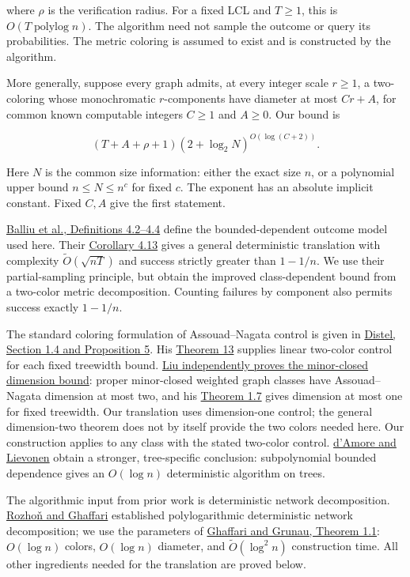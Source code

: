 \documentclass[11pt,a4paper]{article}
\begin{document}
where \(\rho\) is the verification radius.
For a fixed LCL and \(T\ge 1\), this is \(O(T\operatorname{polylog} n)\).
The algorithm need not sample the outcome or query its probabilities.
The metric coloring is assumed to exist and is constructed by the algorithm.

More generally, suppose every graph admits, at every integer scale \(r\ge 1\), a two-coloring whose monochromatic \(r\)-components have diameter at most \(Cr+A\), for common known computable integers \(C\ge 1\) and \(A\ge 0\).
Our bound is

\[ (T+A+\rho+1)(2+\log_2 N)^{O(\log(C+2))}. \]

Here \(N\) is the common size information: either the exact size \(n\), or a polynomial upper bound \(n\le N\le n^c\) for fixed \(c\).
The exponent has an absolute implicit constant.
Fixed \(C,A\) give the first statement.

\href{https://arxiv.org/html/2504.05191v2\#S4}{Balliu et al., Definitions 4.2--4.4} define the bounded-dependent outcome model used here.
Their \href{https://arxiv.org/html/2504.05191v2\#S4.SS1}{Corollary 4.13} gives a general deterministic translation with complexity \(\widetilde O(\sqrt{nT})\) and success strictly greater than \(1-1/n\).
We use their partial-sampling principle, but obtain the improved class-dependent bound from a two-color metric decomposition.
Counting failures by component also permits success exactly \(1-1/n\).

The standard coloring formulation of Assouad--Nagata control is given in \href{https://arxiv.org/html/2308.10377v3\#S1.SS4}{Distel, Section 1.4 and Proposition 5}.
His \href{https://arxiv.org/html/2308.10377v3\#S3}{Theorem 13} supplies linear two-color control for each fixed treewidth bound.
\href{https://arxiv.org/html/2308.12273v5\#S1.SS1}{Liu independently proves the minor-closed dimension bound}: proper minor-closed weighted graph classes have Assouad--Nagata dimension at most two, and his \href{https://arxiv.org/html/2308.12273v5\#S1.SS2.SSS4}{Theorem 1.7} gives dimension at most one for fixed treewidth.
Our translation uses dimension-one control; the general dimension-two theorem does not by itself provide the two colors needed here.
Our construction applies to any class with the stated two-color control.
\href{https://arxiv.org/abs/2608.16854v1}{d'Amore and Lievonen} obtain a stronger, tree-specific conclusion: subpolynomial bounded dependence gives an \(O(\log n)\) deterministic algorithm on trees.

The algorithmic input from prior work is deterministic network decomposition.
\href{https://arxiv.org/abs/1907.10937}{Rozhoň and Ghaffari} established polylogarithmic deterministic network decomposition; we use the parameters of \href{https://arxiv.org/html/2410.19516v1\#S1}{Ghaffari and Grunau, Theorem 1.1}: \(O(\log n)\) colors, \(O(\log n)\) diameter, and \(\widetilde O(\log^2 n)\) construction time.
All other ingredients needed for the translation are proved below.
\end{document}
